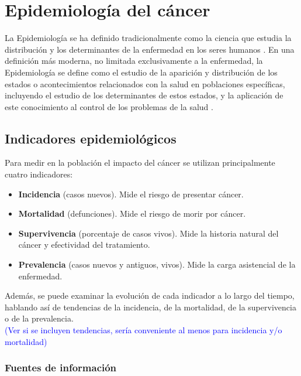 \chapter{Epidemiología del cáncer}

La Epidemiología se ha definido tradicionalmente como la ciencia que estudia la distribución y los determinantes de la enfermedad en los seres humanos \cite{MacMahon1970}. En una definición más moderna, no limitada exclusivamente a la enfermedad, la Epidemiología se define como el estudio de la aparición y distribución de los estados o acontecimientos relacionados con la salud en poblaciones específicas, incluyendo el estudio de los determinantes de estos estados, y la aplicación de este conocimiento al control de los problemas de la salud \cite{Porta2008}.

\section{Indicadores epidemiológicos}

Para medir en la población el impacto del cáncer se utilizan principalmente cuatro indicadores:

\begin{itemize}
	\item \textbf{Incidencia} (casos nuevos). Mide el riesgo de presentar cáncer.
	\item \textbf{Mortalidad} (defunciones). Mide el riesgo de morir por cáncer.
	\item \textbf{Supervivencia} (porcentaje de casos vivos). Mide la historia natural del cáncer y efectividad del tratamiento.
	\item \textbf{Prevalencia} (casos nuevos y antiguos, vivos). Mide la carga asistencial de la enfermedad.
\end{itemize}

Además, se puede examinar la evolución de cada indicador a lo largo del tiempo, hablando así de tendencias de la incidencia, de la mortalidad, de la supervivencia o de la prevalencia.\\

\textcolor{blue}{(Ver si se incluyen tendencias, sería conveniente al menos para incidencia y/o mortalidad)}


\subsection{Fuentes de información}


